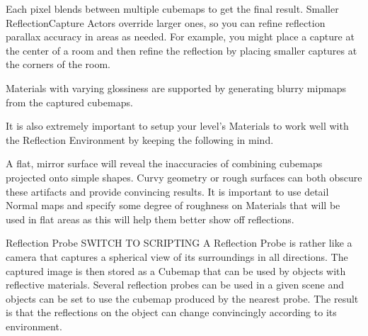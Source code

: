 Each pixel blends between multiple cubemaps to get the final result. Smaller ReflectionCapture Actors override larger ones, so you can refine reflection parallax accuracy in areas as needed. For example, you might place a capture at the center of a room and then refine the reflection by placing smaller captures at the corners of the room.

Materials with varying glossiness are supported by generating blurry mipmaps from the captured cubemaps.





It is also extremely important to setup your level's Materials to work well with the Reflection Environment by keeping the following in mind.

A flat, mirror surface will reveal the inaccuracies of combining cubemaps projected onto simple shapes.
Curvy geometry or rough surfaces can both obscure these artifacts and provide convincing results.
It is important to use detail Normal maps and specify some degree of roughness on Materials that will be used in flat areas as this will help them better show off reflections.




Reflection Probe
SWITCH TO SCRIPTING
A Reflection Probe is rather like a camera that captures a spherical view of its surroundings in all directions. The captured image is then stored as a Cubemap that can be used by objects with reflective materials. Several reflection probes can be used in a given scene and objects can be set to use the cubemap produced by the nearest probe. The result is that the reflections on the object can change convincingly according to its environment.




